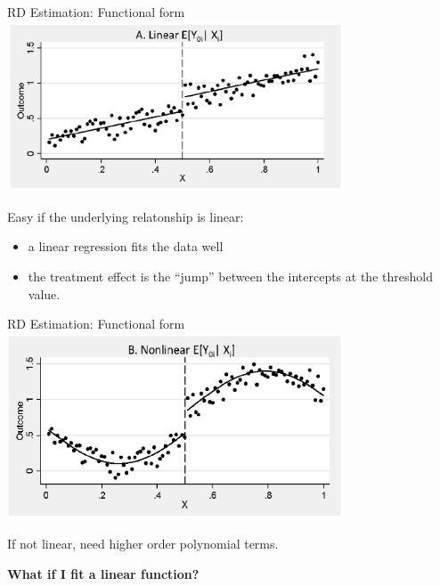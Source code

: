 \documentclass[
  ignorenonframetext,
]{beamer}
\begin{document}
\begin{frame}{RD Estimation: Functional form}
\protect\hypertarget{rd-estimation-functional-form-1}{}
\includegraphics[width=0.75\textwidth,height=\textheight]{"images/rdlinear.png"}

Easy if the underlying relatonship is linear:

\begin{itemize}
\item
  a linear regression fits the data well
\item
  the treatment effect is the ``jump'' between the intercepts at the
  threshold value.
\end{itemize}
\end{frame}

\begin{frame}{RD Estimation: Functional form}
\protect\hypertarget{rd-estimation-functional-form-2}{}
\includegraphics[width=0.75\textwidth,height=\textheight]{"images/RDnonlin.png"}

If not linear, need higher order polynomial terms.

\textbf{What if I fit a linear function?}
\end{frame}
\end{document}
